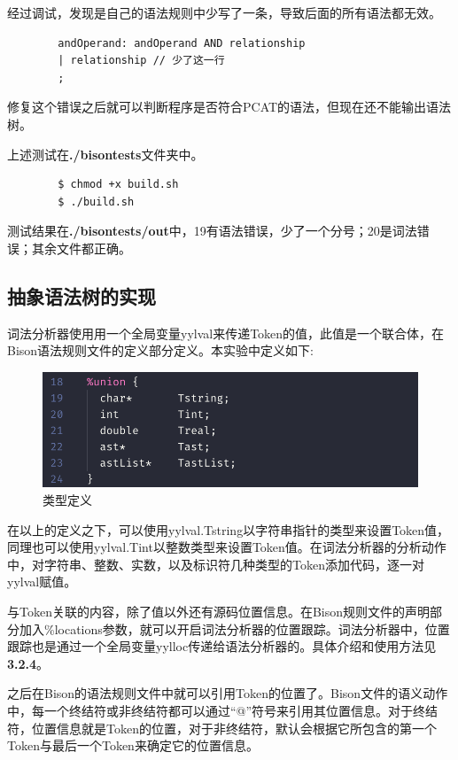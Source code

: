 \documentclass{article}
\begin{document}
	经过调试，发现是自己的语法规则中少写了一条，导致后面的所有语法都无效。
	
	\begin{small}
		\begin{lstlisting}
		andOperand: andOperand AND relationship
		| relationship // 少了这一行
		;
		\end{lstlisting}
	\end{small}
	
	修复这个错误之后就可以判断程序是否符合PCAT的语法，但现在还不能输出语法树。
	
	上述测试在\textbf{./bisontests}文件夹中。
	
	\begin{commandline}
		\begin{verbatim}
		$ chmod +x build.sh
		$ ./build.sh
		\end{verbatim}
	\end{commandline}

	测试结果在\textbf{./bisontests/out}中，19有语法错误，少了一个分号；20是词法错误；其余文件都正确。


\subsection{抽象语法树的实现}
	词法分析器使⽤用⼀个全局变量yylval来传递Token的值，此值是⼀个联合体，在Bison语法规则⽂件的定义部分定义。本实验中定义如下:
	\begin{figure}[H]
		\centering
		\includegraphics[width=0.7\linewidth]{define}
		\caption{类型定义}
		\label{fig:define}
	\end{figure}

	在以上的定义之下，可以使⽤yylval.Tstring以字符串指针的类型来设置Token值，同理也可以使⽤yylval.Tint以整数类型来设置Token值。在词法分析器的分析动作中，对字符串、整数、实数，以及标识符几种类型的Token添加代码，逐一对yylval赋值。
	
	与Token关联的内容，除了值以外还有源码位置信息。在Bison规则⽂件的声明部分加入\%locations参数，就可以开启词法分析器的位置跟踪。词法分析器中，位置跟踪也是通过一个全局变量yylloc传递给语法分析器的。具体介绍和使用方法见\textbf{3.2.4}。
	
	之后在Bison的语法规则⽂件中就可以引⽤Token的位置了。Bison⽂件的语义动作中，每⼀个终结符或⾮终结符都可以通过“@”符号来引⽤其位置信息。对于终结符，位置信息就是Token的位置，对于非终结符，默认会根据它所包含的第⼀个Token与最后⼀个Token来确定它的位置信息。
	
\end{document}
